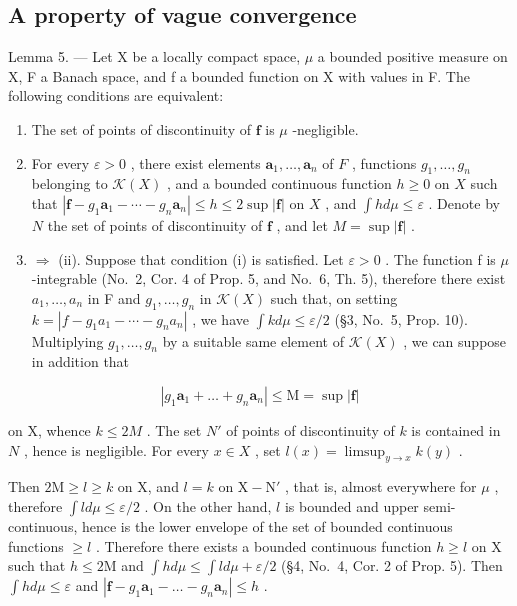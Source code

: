 \subsection{A property of vague convergence}

Lemma 5. --- Let X be a locally compact space, \(\mu\) a bounded positive measure on X, F a Banach space, and f a bounded function on X with values in F. The following conditions are equivalent:

\begin{enumerate}
\def\labelenumi{(\roman{enumi})}
\item
  The set of points of discontinuity of \(\mathbf{f}\) is \(\mu\) -negligible.
\item
  For every \(\varepsilon > 0\) , there exist elements \(\mathbf{a}_1, \ldots, \mathbf{a}_n\) of \(F\) , functions \(g_1, \ldots, g_n\) belonging to \(\mathcal{K}(X)\) , and a bounded continuous function \(h \geqslant 0\) on \(X\) such that \(|\mathbf{f} - g_1 \mathbf{a}_1 - \cdots - g_n \mathbf{a}_n| \leqslant h \leqslant 2 \sup |\mathbf{f}|\) on \(X\) , and \(\int h d\mu \leqslant \varepsilon\) . Denote by \(N\) the set of points of discontinuity of \(\mathbf{f}\) , and let \(M = \sup |\mathbf{f}|\) .
\setcounter{enumi}{0}
\item
  \(\Rightarrow\) (ii). Suppose that condition (i) is satisfied. Let \(\varepsilon > 0\) . The function f is \(\mu\) -integrable (No.~2, Cor. 4 of Prop. 5, and No.~6, Th. 5), therefore there exist \(a_{1}, \ldots, a_{n}\) in F and \(g_{1}, \ldots, g_{n}\) in \(\mathcal{K}(X)\) such that, on setting \(k = |f - g_{1}a_{1} - \cdots - g_{n}a_{n}|\) , we have \(\int k d\mu \leqslant \varepsilon/2\) (§3, No.~5,
Prop. 10). Multiplying \(g_1, \ldots, g_n\) by a suitable same element of \(\mathcal{K}(X)\) , we can suppose in addition that
\end{enumerate}

\[
\left| g _ {1} \mathbf {a} _ {1} + \dots + g _ {n} \mathbf {a} _ {n} \right| \leqslant \mathrm{M} = \sup | \mathbf {f} |
\]

on X, whence \(k \leqslant 2M\) . The set \(N'\) of points of discontinuity of \(k\) is contained in \(N\) , hence is negligible. For every \(x \in X\) , set \(l(x) = \limsup_{y \to x} k(y)\) .

Then \(2\mathrm{M} \geqslant l \geqslant k\) on X, and \(l = k\) on \(\mathrm{X} - \mathrm{N}'\) , that is, almost everywhere for \(\mu\) , therefore \(\int l d\mu \leqslant \varepsilon / 2\) . On the other hand, \(l\) is bounded and upper semi-continuous, hence is the lower envelope of the set of bounded continuous functions \(\geqslant l\) . Therefore there exists a bounded continuous function \(h \geqslant l\) on X such that \(h \leqslant 2\mathrm{M}\) and \(\int h d\mu \leqslant \int l d\mu + \varepsilon / 2\) (§4, No.~4, Cor. 2 of Prop. 5). Then \(\int h d\mu \leqslant \varepsilon\) and \(|\mathbf{f} - g_1\mathbf{a}_1 - \dots - g_n\mathbf{a}_n| \leqslant h\) .

